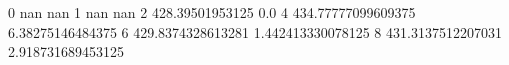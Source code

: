 0 nan nan
1 nan nan
2 428.39501953125 0.0
4 434.77777099609375 6.38275146484375
6 429.8374328613281 1.442413330078125
8 431.3137512207031 2.918731689453125
